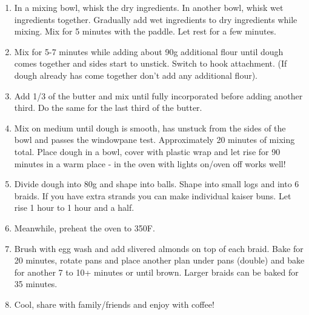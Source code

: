 \begin{enumerate}
    \item In a mixing bowl, whisk the dry ingredients. In another bowl, whisk wet ingredients together. Gradually add wet ingredients to dry ingredients while mixing. Mix for 5 minutes with the paddle. Let rest for a few minutes.
    \item Mix for 5-7 minutes while adding about 90g additional flour until dough comes together and sides start to unstick. Switch to hook attachment. (If dough already has come together don't add any additional flour).
    \item Add 1/3 of the butter and mix until fully incorporated before adding another third. Do the same for the last third of the butter.
    \item Mix on medium until dough is smooth, has unstuck from the sides of the bowl and passes the windowpane test. Approximately 20 minutes of mixing total. Place dough in a bowl, cover with plastic wrap and let rise for 90 minutes in a warm place - in the oven with lights on/oven off works well!
    \item Divide dough into 80g and shape into balls. Shape into small logs and into 6 braids. If you have extra strands you can make individual kaiser buns. Let rise 1 hour to 1 hour and a half. 
    \item Meanwhile, preheat the oven to 350\degree F.
    \item Brush with egg wash and add slivered almonds on top of each braid. Bake for 20 minutes, rotate pans and place another plan under pans (double) and bake for another 7 to 10+ minutes or until brown. Larger braids can be baked for 35 minutes.
    \item Cool, share with family/friends and enjoy with coffee!
\end{enumerate}



